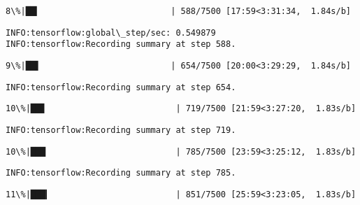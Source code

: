 \documentclass[11pt]{article}
\begin{document}
    \begin{Verbatim}[commandchars=\\\{\}]
  8\%|██▎                          | 588/7500 [17:59<3:31:34,  1.84s/b]
    \end{Verbatim}

    \begin{Verbatim}[commandchars=\\\{\}]
INFO:tensorflow:global\_step/sec: 0.549879
INFO:tensorflow:Recording summary at step 588.

    \end{Verbatim}

    \begin{Verbatim}[commandchars=\\\{\}]
  9\%|██▌                          | 654/7500 [20:00<3:29:29,  1.84s/b]
    \end{Verbatim}

    \begin{Verbatim}[commandchars=\\\{\}]
INFO:tensorflow:Recording summary at step 654.

    \end{Verbatim}

    \begin{Verbatim}[commandchars=\\\{\}]
 10\%|██▊                          | 719/7500 [21:59<3:27:20,  1.83s/b]
    \end{Verbatim}

    \begin{Verbatim}[commandchars=\\\{\}]
INFO:tensorflow:Recording summary at step 719.

    \end{Verbatim}

    \begin{Verbatim}[commandchars=\\\{\}]
 10\%|███                          | 785/7500 [23:59<3:25:12,  1.83s/b]
    \end{Verbatim}

    \begin{Verbatim}[commandchars=\\\{\}]
INFO:tensorflow:Recording summary at step 785.

    \end{Verbatim}

    \begin{Verbatim}[commandchars=\\\{\}]
 11\%|███▎                         | 851/7500 [25:59<3:23:05,  1.83s/b]
    \end{Verbatim}
\end{document}
